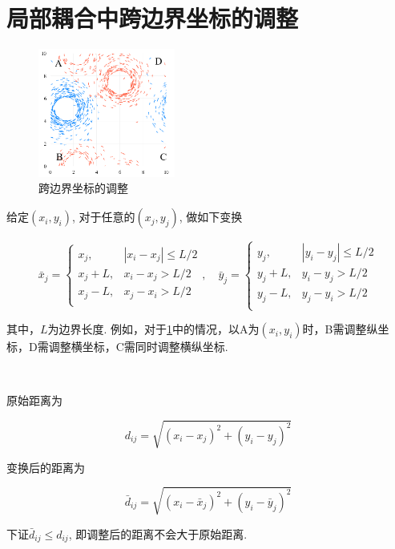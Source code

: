 \documentclass{article}
\begin{document}
\section{局部耦合中跨边界坐标的调整}\label{positionAdj}

\begin{figure}[htbp]
    \centering
    \includegraphics[width=0.4\textwidth]{./figs/fig1.jpg}
    \caption{跨边界坐标的调整}
    \label{fig:fig1}
\end{figure}

给定$(x_i, y_i)$, 对于任意的$(x_j, y_j)$, 做如下变换

\begin{equation}\label{eq:eq1}
	\bar{x}_j=\begin{cases}
		x_j,&		|x_i-x_j|\le L/2\\
		x_j+L,&		x_i-x_j>L/2\\
		x_j-L,&		x_j-x_i>L/2\\
	\end{cases} ,\quad
	\bar{y}_j=\begin{cases}
		y_j,&		|y_i-y_j|\le L/2\\
		y_j+L,&		y_i-y_j>L/2\\
		y_j-L,&		y_j-y_i>L/2\\
	\end{cases}
\end{equation}

其中，$L$为边界长度. 例如，对于\ref{fig:fig1}中的情况，以A为$(x_i, y_i)$时，B需调整纵坐标，D需调整横坐标，C需同时调整横纵坐标.

$\ $

原始距离为

$$
d_{ij}=\sqrt{(x_i-x_j)^2+(y_i-y_j)^2}
$$

变换后的距离为

$$
\bar{d}_{ij}=\sqrt{(x_i-\bar{x}_j)^2+(y_i-\bar{y}_j)^2}
$$

下证$\bar{d}_{ij} \le d_{ij}$, 即调整后的距离不会大于原始距离.

$ $
\end{document}
